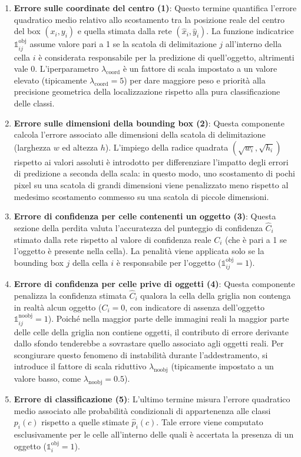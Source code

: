 ﻿\documentclass[11pt, a4paper]{article}
\begin{document}
\begin{enumerate}
    \item \textbf{Errore sulle coordinate del centro (1)}:
    Questo termine quantifica l'errore quadratico medio relativo allo scostamento tra la posizione reale del centro del box $(x_i, y_i)$ e quella stimata dalla rete $(\hat{x}_i, \hat{y}_i)$. La funzione indicatrice $\mathbb{1}_{ij}^{\text{obj}}$ assume valore pari a 1 se la scatola di delimitazione $j$ all'interno della cella $i$ è considerata responsabile per la predizione di quell'oggetto, altrimenti vale 0. L'iperparametro $\lambda_{\text{coord}}$ è un fattore di scala impostato a un valore elevato (tipicamente $\lambda_{\text{coord}} = 5$) per dare maggiore peso e priorità alla precisione geometrica della localizzazione rispetto alla pura classificazione delle classi.

    \item \textbf{Errore sulle dimensioni della bounding box (2)}:
    Questa componente calcola l'errore associato alle dimensioni della scatola di delimitazione (larghezza $w$ ed altezza $h$). L'impiego della radice quadrata $(\sqrt{w_i}, \sqrt{h_i})$ rispetto ai valori assoluti è introdotto per differenziare l'impatto degli errori di predizione a seconda della scala: in questo modo, uno scostamento di pochi pixel su una scatola di grandi dimensioni viene penalizzato meno rispetto al medesimo scostamento commesso su una scatola di piccole dimensioni.

    \item \textbf{Errore di confidenza per celle contenenti un oggetto (3)}:
    Questa sezione della perdita valuta l'accuratezza del punteggio di confidenza $\hat{C}_i$ stimato dalla rete rispetto al valore di confidenza reale $C_i$ (che è pari a 1 se l'oggetto è presente nella cella). La penalità viene applicata solo se la bounding box $j$ della cella $i$ è responsabile per l'oggetto ($\mathbb{1}_{ij}^{\text{obj}} = 1$).

    \item \textbf{Errore di confidenza per celle prive di oggetti (4)}:
    Questa componente penalizza la confidenza stimata $\hat{C}_i$ qualora la cella della griglia non contenga in realtà alcun oggetto ($C_i = 0$, con indicatore di assenza dell'oggetto $\mathbb{1}_{ij}^{\text{noobj}} = 1$). Poiché nella maggior parte delle immagini reali la maggior parte delle celle della griglia non contiene oggetti, il contributo di errore derivante dallo sfondo tenderebbe a sovrastare quello associato agli oggetti reali. Per scongiurare questo fenomeno di instabilità durante l'addestramento, si introduce il fattore di scala riduttivo $\lambda_{\text{noobj}}$ (tipicamente impostato a un valore basso, come $\lambda_{\text{noobj}} = 0.5$).

    \item \textbf{Errore di classificazione (5)}:
    L'ultimo termine misura l'errore quadratico medio associato alle probabilità condizionali di appartenenza alle classi $p_i(c)$ rispetto a quelle stimate $\hat{p}_i(c)$. Tale errore viene computato esclusivamente per le celle all'interno delle quali è accertata la presenza di un oggetto ($\mathbb{1}_{i}^{\text{obj}} = 1$).
\end{enumerate}
\end{document}
